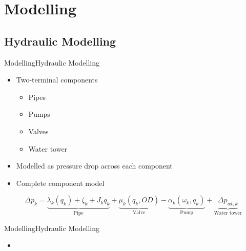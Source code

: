 \section{Modelling}



\subsection{Hydraulic Modelling}

\begin{frame}{Modelling}{Hydraulic Modelling}
\begin{itemize}
	\item<1-> Two-terminal components 
	\begin{itemize}
		\item<1-> Pipes 
		\item<1-> Pumps
		\item<1-> Valves
		\item<1-> Water tower
	\end{itemize}
	\item<1-> Modelled as pressure drop across each component
\end{itemize}

	\begin{itemize}
		\item<2-> Complete component model
	\end{itemize}

\begin{equation}<2->
\label{CompleteModel}
\Delta p_k = \underbrace{\lambda_k (q_k) + \zeta_k + J_k \dot{q_k}}_\text{Pipe} + \underbrace{\mu_k (q_k, OD)}_\text{Valve} - \underbrace{\alpha_k(\omega_k,q_k)}_\text{Pump} + \underbrace{\Delta p_{wt,k}}_\text{Water tower}
\end{equation}

\end{frame}


\begin{frame}{Modelling}{Hydraulic Modelling}
\begin{itemize}
	\item<1-> 
\end{itemize}	
%  
\end{frame}

